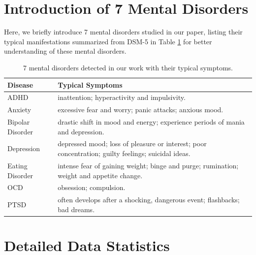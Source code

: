 \section{Introduction of 7 Mental Disorders}
\label{apd:dis_intro}
Here, we briefly introduce 7 mental disorders studied in our paper, listing their typical manifestations summarized from DSM-5 in Table \ref{tab:disease_intro} for better understanding of these mental disorders.

\begin{table}[th]
    \small
    \centering
    \begin{tabular}{m{2.2cm}|m{4cm}}
        \hline
        Disease          & Typical Symptoms \\
        \hline
        ADHD             & inattention; hyperactivity and impulsivity.         \\
        \hline
        Anxiety          &  excessive fear and worry; panic attacks; anxious mood.       \\
        \hline
        Bipolar Disorder & drastic shift in mood and energy; experience periods of mania and depression.        \\
        \hline
        Depression       &  depressed mood; loss of pleasure or interest; poor concentration; guilty feelings; suicidal ideas.      \\
        \hline
        Eating Disorder  &  intense fear of gaining weight; binge and purge; rumination; weight and appetite change.        \\
        \hline
        OCD              & obsession; compulsion.         \\
        \hline
        PTSD             &  often develops after a shocking, dangerous event; flashbacks; bad dreams.        \\
        \hline
    \end{tabular}
    \caption{7 mental disorders detected in our work with their typical symptoms.}
    \label{tab:disease_intro}
\end{table}

\section{Detailed Data Statistics}
\label{apd:stats}

